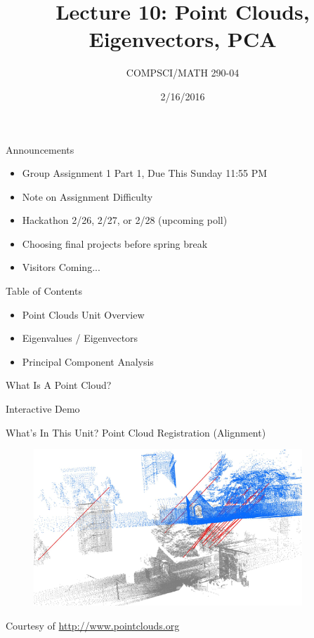 \documentclass{beamer}
\title{Lecture 10: Point Clouds, Eigenvectors, PCA}
\date{2/16/2016}
\institute{Chris Tralie, Duke University}
\author{COMPSCI/MATH 290-04}
\begin{document}
\frame{\titlepage}

\begin{frame}{Announcements}

\begin{itemize}[label=$\blacktriangleright$]
    \item Group Assignment 1 Part 1, Due This Sunday 11:55 PM
    \item Note on Assignment Difficulty
    \item Hackathon 2/26, 2/27, or 2/28 (upcoming poll)
    \item Choosing final projects before spring break
    \item Visitors Coming...
\end{itemize}

\end{frame}

\begin{frame}{Table of Contents}

\begin{itemize}[label=$\blacktriangleright$]
	\item Point Clouds Unit Overview
\end{itemize}
\begin{itemize}[label=$\vartriangleright$]
	\item Eigenvalues / Eigenvectors
	\item Principal Component Analysis
\end{itemize}

\end{frame}

\begin{frame}{What Is A Point Cloud?}

Interactive Demo

\end{frame}


\begin{frame}{What's In This Unit?}
Point Cloud Registration (Alignment)

\begin{figure}[t]
    \centering
	\includegraphics[width=0.9\textwidth]{registration_outdoor_pcl.png}
\end{figure}

Courtesy of \url{http://www.pointclouds.org}

\end{frame}
\end{document}
